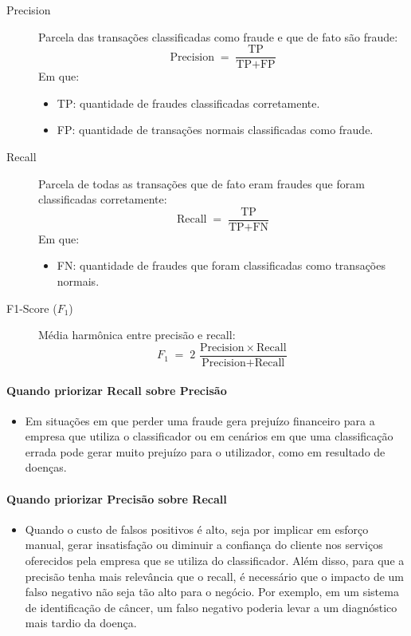 \documentclass[conference]{IEEEtran}
\begin{document}
\begin{description}
  \item[Precision] 
    Parcela das transações classificadas como fraude e que de fato são fraude:
    \[
      \text{Precision} \;=\;
      \frac{\text{TP}}{\text{TP} + \text{FP}}
    \]
    Em que:
    \begin{itemize}
      \item TP: quantidade de fraudes classificadas corretamente.
      \item FP: quantidade de transações normais classificadas como fraude.
    \end{itemize}

  \item[Recall]
    Parcela de todas as transações que de fato eram fraudes que foram classificadas corretamente:
    \[
      \text{Recall} \;=\;
      \frac{\text{TP}}{\text{TP} + \text{FN}}
    \]
    Em que:
    \begin{itemize}
      \item FN: quantidade de fraudes que foram classificadas como transações normais.
    \end{itemize}

  \item[F1-Score (\(F_1\))]
    Média harmônica entre precisão e recall:
    \[
      F_1 \;=\;
      2 \,\frac{\text{Precision}\,\times\,\text{Recall}}
             {\text{Precision} + \text{Recall}}
    \]
\end{description}

\paragraph{Quando priorizar Recall sobre Precisão}
\begin{itemize}
  \item Em situações em que perder uma fraude gera prejuízo financeiro para a empresa que utiliza o classificador ou em cenários em que uma classificação errada pode gerar muito prejuízo para o utilizador, como em resultado de doenças.
\end{itemize}

\paragraph{Quando priorizar Precisão sobre Recall}
\begin{itemize}
  \item Quando o custo de falsos positivos é alto, seja por implicar em esforço manual, gerar insatisfação ou diminuir a confiança do cliente nos serviços oferecidos pela empresa que se utiliza do classificador. Além disso, para que a precisão tenha mais relevância que o recall, é necessário que o impacto de um falso negativo não seja tão alto para o negócio. Por exemplo, em um sistema de identificação de câncer, um falso negativo poderia levar a um diagnóstico mais tardio da doença.
\end{itemize}
\end{document}
